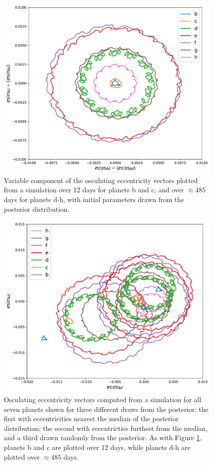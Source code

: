 \documentclass[fleqn,usenatbib]{mnras} %
\begin{document}
\begin{figure}
    \centering
    \includegraphics[width=\hsize]{figures/T1_evector_forced.pdf}
    \caption{Variable component of the osculating eccentricity vectors plotted from a simulation over 12 days for planets b and c, and over $\approx 485$
    days for planets d-h, with initial parameters drawn from the posterior distribution.}
    \label{fig:forced_eccentricity}
\end{figure}

\begin{figure}
    \centering
    \includegraphics[width=\hsize]{figures/T1_evector.pdf}
    \caption{Osculating eccentricity vectors computed from a simulation for all seven planets shown for three different draws from
    the posterior:  the first with eccentricities nearest the median of the posterior distribution;
    the second with eccentricties furthest from the median, and a third drawn randomly from
    the posterior.  As with Figure \ref{fig:forced_eccentricity}, planets b and c are plotted
    over 12 days, while planets d-h are plotted over $\approx 485$ days.}
    \label{fig:total_eccentricity}
\end{figure}
\end{document}
